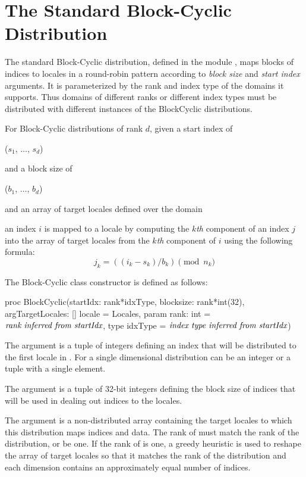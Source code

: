 \section{The Standard Block-Cyclic Distribution}
\label{Block_Cyclic_Dist}
The standard Block-Cyclic distribution, defined in the
module , maps blocks of indices to locales in a
round-robin pattern according to \emph{block size} and \emph{start
index} arguments.  It is parameterized by the rank and index type of
the domains it supports.  Thus domains of different ranks or different
index types must be distributed with different instances of the
BlockCyclic distributions.

For Block-Cyclic distributions of rank $d$, given a start index of
\begin{chapel}
($s_1$, $\ldots$, $s_d$)
\end{chapel}
and a block size of
\begin{chapel}
($b_1$, $\ldots$, $b_d$)
\end{chapel}
and an array of target locales defined over the domain
\begin{chapel}
[$0$..$n_1$-1, $\ldots$, $0$..$n_d$-1]
\end{chapel}
an index $i$ is mapped to a locale by computing
the $k$\emph{th} component of an index $j$ into the array of target
locales from the $k$\emph{th} component of $i$ using the following
formula:
\[j_k = ((i_k - s_k) / b_k) \pmod{n_k}\]

The Block-Cyclic class constructor is defined as follows:
\begin{chapel}
proc BlockCyclic(startIdx: rank*idxType,
                 blocksize: rank*int(32),
                 argTargetLocales: [] locale = Locales,
                 param rank: int = $\mbox{{\it rank inferred from startIdx}}$,
                 type idxType = $\mbox{{\it index type inferred from startIdx}}$)
\end{chapel}

The argument  is a tuple of integers defining an index that
will be distributed to the first locale in . For a single
dimensional distribution  can be an integer or a tuple with a
single element.

The argument  is a tuple of 32-bit integers defining
the block size of indices that will be used in dealing out indices
to the locales.

The argument  is a non-distributed array
containing the target locales to which this distribution maps indices
and data.  The rank of  must match the rank of the
distribution, or be one.  If the rank of
 is one, a greedy heuristic is used to reshape the
array of target locales so that it matches the rank of the
distribution and each dimension contains an approximately equal number
of indices.

